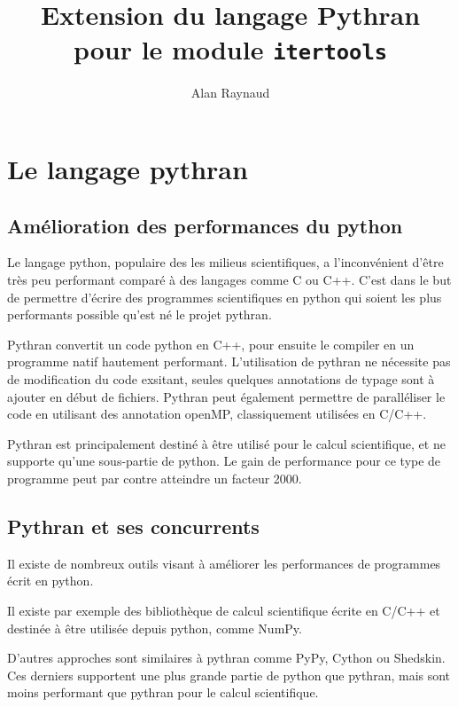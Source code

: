 \documentclass[a4paper]{article}
\title{Extension du langage Pythran pour le module \texttt{itertools}}
\author{Alan Raynaud}
\date{}
\begin{document}

\maketitle   


\clearpage

\section*{Le langage pythran}

\subsection*{Amélioration des performances du python}

Le langage python, populaire des les milieus scientifiques, a
l'inconvénient d'être très peu performant comparé à des langages comme
C ou C++. C'est dans le but de permettre d'écrire des programmes
scientifiques en python qui soient les plus performants possible
qu'est né le projet pythran.

Pythran convertit un code python en C++, pour ensuite le compiler en
un programme natif hautement performant. L'utilisation de pythran ne
nécessite pas de modification du code exsitant, seules quelques
annotations de typage sont à ajouter en début de fichiers. Pythran
peut également permettre de paralléliser le code en utilisant des
annotation openMP, classiquement utilisées en C/C++.

Pythran est principalement destiné à être utilisé pour le calcul
scientifique, et ne supporte qu'une sous-partie de python. Le gain de
performance pour ce type de programme peut par contre atteindre un
facteur 2000.

\subsection*{Pythran et ses concurrents}

Il existe de nombreux outils visant à améliorer les performances de
programmes écrit en python.

Il existe par exemple des bibliothèque de calcul scientifique écrite
en C/C++ et destinée à être utilisée depuis python, comme NumPy.

D'autres approches sont similaires à pythran comme PyPy, Cython ou
Shedskin. Ces derniers supportent une plus grande partie de python que
pythran, mais sont moins performant que pythran pour le calcul
scientifique.
\end{document}
